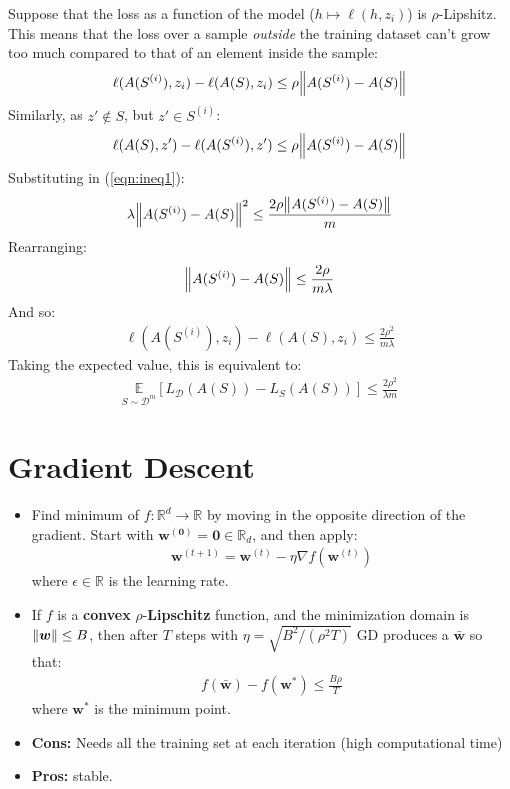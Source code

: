 \documentclass[../template.tex]{subfiles}
\begin{document}
\begin{itemize}
    Suppose that the loss as a function of the model ($h \mapsto \ell(h, z_i)$) is $\rho$-Lipshitz. This means that the loss over a sample \textit{outside} the training dataset can't grow too much compared to that of an element inside the sample: 
    \begin{align*}
        \ell(A(S^{(i)}), z_i) - \ell(A(S), z_i) \leq \rho\norm{A(S^{(i)}) - A(S)}
    \end{align*}  
    Similarly, as $z' \notin S$, but $z' \in S^{(i)}$:
    \begin{align*}
        \ell(A(S), z') - \ell(A(S^{(i)}), z') \leq \rho \norm{A(S^{(i)})-A(S)} 
    \end{align*}
    Substituting in (\ref{eqn:ineq1}):
    \begin{align*}
        \lambda \norm{A(S^{(i)}) - A(S)}^2 \leq \frac{2 \rho \norm{A(S^{(i)}) - A(S)} }{m} 
    \end{align*}
    Rearranging:
    \begin{align*}
        \norm{A(S^{(i)}) - A(S)} \leq \frac{2 \rho}{m \lambda} 
    \end{align*}
    And so:
    \begin{align*}
        \ell(A(S^{(i)}), z_i) - \ell(A(S), z_i) \leq \frac{2 \rho^2}{m \lambda} 
    \end{align*}
    Taking the expected value, this is equivalent to:
    \begin{align*}
        \underset{S \sim \mathcal{D}^m}{\mathbb{E}} [L_{\mathcal{D}}(A(S)) - L_S(A(S))] \leq\frac{2 \rho^2}{\lambda m}  
    \end{align*}
\end{itemize}

\section{Gradient Descent}
\begin{itemize}
    \item Find minimum of $f \colon \mathbb{R}^d \to \mathbb{R}$ by moving in the opposite direction of the gradient. Start with $\bm{w^{(0)}} = \bm{0} \in \mathbb{R}_d$, and then apply:
    \begin{align*}
        \bm{w}^{(t+1)} = \bm{w}^{(t)} - \eta \nabla f(\bm{w}^{(t)})
    \end{align*}
    where $\epsilon \in \mathbb{R}$ is the learning rate.
    \item If $f$ is a \textbf{convex} $\rho$-\textbf{Lipschitz} function, and the minimization domain is $\norm{\bm{w}} \leq B$, then after $T$ steps with $\eta = \sqrt{B^2/(\rho^2 T)}$ GD produces a $\bar{\bm{w}}$ so that:
    \begin{align*}
        f(\bar{\bm{w}}) - f(\bm{w^*}) \leq \frac{B \rho}{T} 
    \end{align*}
    where $\bm{w^*}$ is the minimum point.
    \item \textbf{Cons:} Needs all the training set at each iteration (high computational time)
    \item \textbf{Pros:} stable. 
\end{itemize}
\end{document}
